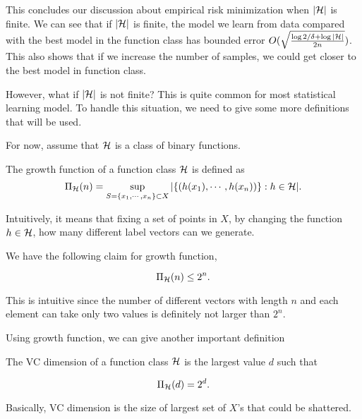 \documentclass[../main.tex]{subfiles}
\begin{document}
	This concludes our discussion about empirical risk minimization when $|\mathcal{H}|$ is finite. We can see that if $|\mathcal{H}|$ is finite, the model we learn from data compared with the best model in the function class has bounded error $O(\sqrt{\frac{\log 2 / \delta + \log |\mathcal{H}|}{2n}})$. This also shows that if we increase the number of samples, we could get closer to the best model in function class. 
	
	However, what if $|\mathcal{H}|$ is not finite? This is quite common for most statistical learning model. To handle this situation, we need to give some more definitions that will be used. 
	
	For now, assume that $\mathcal{H}$ is a class of binary functions.
	
	\begin{definition}
		The growth function of a function class $\mathcal{H}$ is defined as
		\begin{equation*}
			\Pi_{\mathcal{H}}(n) = \sup\limits_{S= \{x_1, \cdots, x_n\} \subset X} |\{(h(x_1), \cdots, h(x_n))\} : h\in \mathcal{H}|.
		\end{equation*}
	\end{definition}

	Intuitively, it means that fixing a set of points in $X$, by changing the function $h\in \mathcal{H}$, how many different label vectors can we generate.
	
	We have the following claim for growth function,
	
	\begin{claim}
			\begin{equation*}
				\Pi_{\mathcal{H}}(n) \leq 2^n.
			\end{equation*}
	\end{claim} 
	
	This is intuitive since the number of different vectors with length $n$ and each element can take only two values is definitely not larger than $2^n$.
	
	Using growth function, we can give another important definition
	
	\begin{definition}
		The VC dimension of a function class $\mathcal{H}$ is the largest value $d$ such that
		
		\begin{equation}
			\Pi_{\mathcal{H}}(d) = 2^d.
		\end{equation}
		
		Basically, VC dimension is the size of largest set of $X$'s that could be shattered.
	\end{definition}
\end{document}
